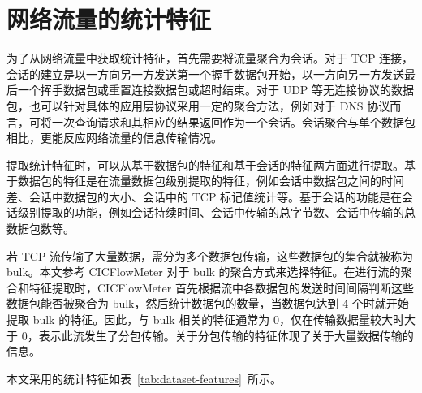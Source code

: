 {\section{网络流量的统计特征}

为了从网络流量中获取统计特征，首先需要将流量聚合为会话。对于 TCP 连接，会话的建立是以一方向另一方发送第一个握手数据包开始，以一方向另一方发送最后一个挥手数据包或重置连接数据包或超时结束。对于 UDP 等无连接协议的数据包，也可以针对具体的应用层协议采用一定的聚合方法，例如对于 DNS 协议而言，可将一次查询请求和其相应的结果返回作为一个会话。会话聚合与单个数据包相比，更能反应网络流量的信息传输情况。

提取统计特征时，可以从基于数据包的特征和基于会话的特征两方面进行提取\citep{WANG2022102542}。基于数据包的特征是在流量数据包级别提取的特征，例如会话中数据包之间的时间差、会话中数据包的大小、会话中的 TCP 标记值统计等。基于会话的功能是在会话级别提取的功能，例如会话持续时间、会话中传输的总字节数、会话中传输的总数据包数等。

若 TCP 流传输了大量数据，需分为多个数据包传输，这些数据包的集合就被称为 bulk。本文参考 CICFlowMeter\citep{engelen2021troubleshooting} 对于 bulk 的聚合方式来选择特征。在进行流的聚合和特征提取时，CICFlowMeter 首先根据流中各数据包的发送时间间隔判断这些数据包能否被聚合为 bulk，然后统计数据包的数量，当数据包达到 4 个时就开始提取 bulk 的特征。因此，与 bulk 相关的特征通常为 $0$，仅在传输数据量较大时大于 $0$，表示此流发生了分包传输。关于分包传输的特征体现了关于大量数据传输的信息。

本文采用的统计特征如表~\ref{tab:dataset-features}~所示。

}
